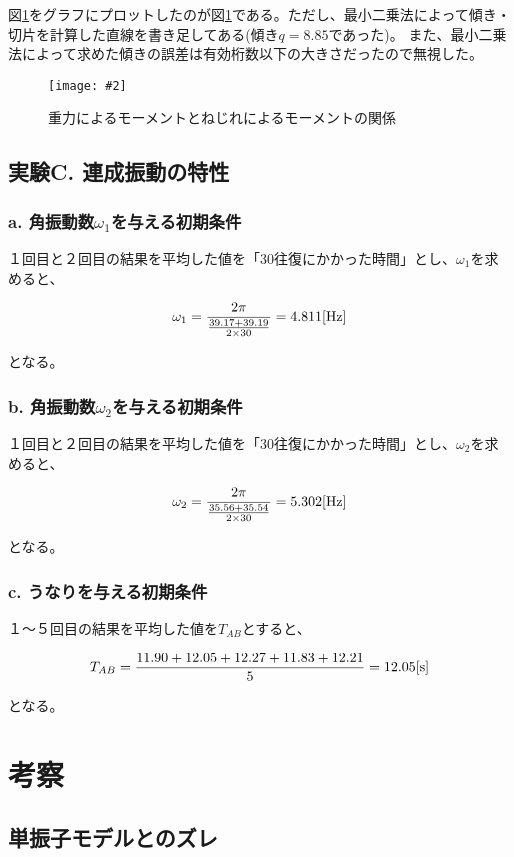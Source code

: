 \documentclass[uplatex,11pt]{jsarticle}
\newcommand{\fg}[3]{ %
    \begin{figure}
        \begin{center}
            \texttt{[image: \#2]}
            \caption{#3}
            \label{fg_#1}
        \end{center}
    \end{figure}
}
\newcommand{\fr}[1]{図\ref{fg_#1}}
\begin{document}
\fr{B}をグラフにプロットしたのが\fr{B}である。ただし、最小二乗法によって傾き・切片を計算した直線を書き足してある(傾き$q = 8.85$であった)。
また、最小二乗法によって求めた傾きの誤差は有効桁数以下の大きさだったので無視した。

\fg{B}{graph/b_with_regression.png}{重力によるモーメントとねじれによるモーメントの関係}

\subsection*{実験C. 連成振動の特性}

\subsubsection*{a. 角振動数$\omega_1$を与える初期条件}

１回目と２回目の結果を平均した値を「30往復にかかった時間」とし、$\omega_1$を求めると、

\[
    \omega_1 = \frac{2\pi}{\frac{39.17 + 39.19}{2 \times 30}} = 4.811 [{\rm Hz}]
\]

となる。

\subsubsection*{b. 角振動数$\omega_2$を与える初期条件}

１回目と２回目の結果を平均した値を「30往復にかかった時間」とし、$\omega_2$を求めると、

\[
    \omega_2 = \frac{2\pi}{\frac{35.56 + 35.54}{2 \times 30}} = 5.302 [{\rm Hz}]
\]

となる。

\subsubsection*{c. うなりを与える初期条件}

１〜５回目の結果を平均した値を$T_{AB}$とすると、

\[
    T_{AB} = \frac{11.90 + 12.05 + 12.27 + 11.83 + 12.21}{5} = 12.05 [{\rm s}]
\]

となる。

\section{考察}

\subsection{単振子モデルとのズレ}
\end{document}
